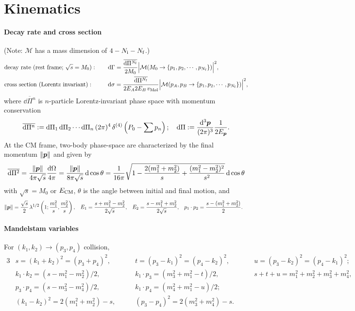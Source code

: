 \documentclass[CheatSheet]{subfiles}
\begin{document}
\newcommand{\ddP}[2][3]{\frac{\dd^{#1}\vc#2}{(2\pi)^{#1}}}

\summarystyle
\section{Kinematics}

\paragraph{Decay rate and cross section}  (Note: $\mathcal M$ has a mass dimension of $4-N_{\mathrm{i}}-N_{\mathrm{f}}$.)
\begin{alignat}{2}
&
\text{decay rate (rest frame; $\sqrt{s}=M_0$)}:
&\quad&
\dd\Gamma=
\frac{\overline{\dd\Pi^{N\w f}}}{2M_0}
\Bigl|\mathcal M(M_0\to\left\{p_1, p_2,\cdots, p_{N\w f}\right\})\Bigr|^2,
\\
&\text{cross section (Lorentz invariant)}:
&&
\dd\sigma =
\frac{\overline{\dd\Pi^{N\w f}}}{2E_A2E_B\,v_{\text{M\o l}}}
\Bigl|\mathcal M(p_A,p_B\to\left\{p_1, p_2,\cdots, p_{N\w f}\right\})\Bigr|^2,
\end{alignat}
where $\overline{\dd\Pi^{n}}$ is $n$-particle Lorentz-invariant phase space with momentum conservation
\begin{equation}
  \overline{\dd\Pi^{n}} := \dd\Pi_1\dd\Pi_2\cdots\dd\Pi_n\,(2\pi)^4\diracdelta[4]\left(P_0-\sum p_n\right);
\quad
 \dd\Pi := \ddP{p}\frac{1}{2E_{\vc p}}.
\end{equation}
At the CM frame, two-body phase-space are characterized by the final momentum $\|{\bm{p}}\|$ and given by
\begin{equation}
\overline{\mathop{}\!\mathrm{d}\Pi^{2}}
=\frac{\|{\bm{p}}\|}{4\pi\sqrt{s}}\frac{\mathop{}\!\mathrm{d}\Omega}{4\pi}
=
\frac{\|{\bm{p}}\|}{8\pi \sqrt{s}}\mathop{}\!\mathrm{d}\cos\theta
=
\frac1{16\pi}\sqrt{1-\frac{2 (m_1^2+m_2^2)}{s}+\frac{(m_1^2-m_2^2)^2}{s^2}}\mathop{}\!\mathrm{d}\cos\theta
\end{equation}
with $\sqrt s = M_0$ or $E_{\mathrm{CM}}$, $\theta$ is the angle between initial and final motion, and
\begin{align*}
\|{\bm{p}}\|&=\frac{\sqrt{s}}{2}\mathop{\lambda^{1/2}}\left(1;\frac{m_1^2}{s},\frac{m_2^2}{s}\right),&
 E_1&=\frac{s+m_1^2-m_2^2}{2\sqrt{s}},&
 E_2&=\frac{s-m_1^2+m_2^2}{2\sqrt{s}},&
 p_1\cdot p_2 &= \frac{s-(m_1^2+m_2^2)}{2}.
\end{align*}
\paragraph{Mandelstam variables} For $(k_1,k_2)\to(p_3,p_4)$ collision,
\begin{alignat*}{3}
 &s = (k_1+k_2)^2 = (p_3+p_4)^2, \qquad
 &&t = (p_3-k_1)^2 = (p_4-k_2)^2, \qquad
 &&u = (p_3-k_2)^2 = (p_4-k_1)^2;\\
 & k_1\cdot k_2 = (s-m_1^2-m_2^2)/2,
 &&k_1\cdot p_3 = (m_3^2 + m_1^2 - t)/2,
 && s+t+u=m_1^2+m_2^2+m_3^2+m_4^2,\\
 & p_3\cdot p_4 = (s-m_3^2-m_4^2)/2,
 &&k_1\cdot p_4 = (m_4^2 + m_1^2 - u)/2;
 \\&(k_1-k_2)^2 =  2(m_1^2+m_2^2)-s,
  &&(p_3-p_4)^2 = 2(m_3^2 + m_4^2) - s.
\end{alignat*}
\end{document}
